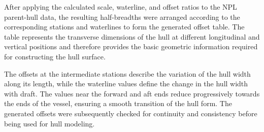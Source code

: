 \documentclass[12pt,a4paper,twoside]{report}
\begin{document}
\vspace{\baselineskip}\par\noindent After applying the calculated scale, waterline, and offset ratios to the NPL parent-hull data, the resulting half-breadths were arranged according to the corresponding stations and waterlines to form the generated offset table. The table represents the transverse dimensions of the hull at different longitudinal and vertical positions and therefore provides the basic geometric information required for constructing the hull surface.

\vspace{\baselineskip}\par\noindent The offsets at the intermediate stations describe the variation of the hull width along its length, while the waterline values define the change in the hull width with draft. The values near the forward and aft ends reduce progressively towards the ends of the vessel, ensuring a smooth transition of the hull form. The generated offsets were subsequently checked for continuity and consistency before being used for hull modeling.
\end{document}
